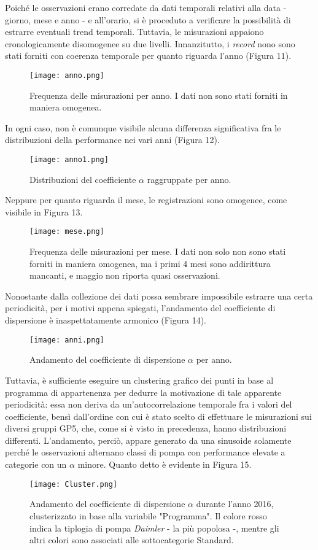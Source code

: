 \documentclass[fleqn,10pt]{SelfArx} %
\begin{document}
Poiché le osservazioni erano corredate da dati temporali relativi alla data - giorno, mese e anno - e all'orario, si è proceduto a verificare la possibilità di estrarre eventuali trend temporali. Tuttavia, le misurazioni appaiono cronologicamente disomogenee su due livelli. Innanzitutto, i \textit{record} nono sono stati forniti con coerenza temporale per quanto riguarda l'anno (Figura 11). 
\begin{figure}[H]
    \centering
    \texttt{[image: anno.png]}
    \label{fig:em}
    \caption{Frequenza delle misurazioni per anno. I dati non sono stati forniti in maniera omogenea.}
\end{figure}
In ogni caso, non è comunque visibile alcuna differenza significativa fra le distribuzioni della performance nei vari anni (Figura 12).
\begin{figure}[H]
    \centering
    \texttt{[image: anno1.png]}
    \label{fig:em}
    \caption{Distribuzioni del coefficiente $\alpha$ raggruppate per anno.}
\end{figure}
Neppure per quanto riguarda il mese, le registrazioni sono omogenee, come visibile in Figura 13.
\begin{figure}[H]
    \centering
    \texttt{[image: mese.png]}
    \label{fig:em}
    \caption{Frequenza delle misurazioni per mese. I dati non solo non sono stati forniti in maniera omogenea, ma i primi 4 mesi sono addirittura mancanti, e maggio non riporta quasi osservazioni.}
\end{figure}
Nonostante dalla collezione dei dati possa sembrare impossibile estrarre una certa periodicità, per i motivi appena spiegati, l'andamento del coefficiente di dispersione è inaspettatamente armonico (Figura 14).
\begin{figure}[H]
    \centering
    \texttt{[image: anni.png]}
    \label{fig:em}
    \caption{Andamento del coefficiente di dispersione $\alpha$ per anno.}
\end{figure}
Tuttavia, è sufficiente eseguire un clustering grafico dei punti in base al programma di appartenenza per dedurre la motivazione di tale apparente periodicità: essa non deriva da un'autocorrelazione temporale fra i valori del coefficiente, bensì dall'ordine con cui è stato scelto di effettuare le misurazioni sui diversi gruppi GP5, che, come si è visto in precedenza, hanno distribuzioni differenti. L'andamento, perciò, appare generato da una sinusoide solamente perché le osservazioni alternano classi di pompa con performance elevate a categorie con un $\alpha$ minore. Quanto detto è evidente in Figura 15.
\begin{figure}[H]
    \centering
    \texttt{[image: Cluster.png]}
    \label{fig:em}
    \caption{Andamento del coefficiente di dispersione $\alpha$ durante l'anno 2016, clusterizzato in base alla variabile "Programma". Il colore rosso indica la tiplogia di pompa \textit{Daimler} - la più popolosa -, mentre gli altri colori sono associati alle sottocategorie Standard.}
\end{figure}
\end{document}
